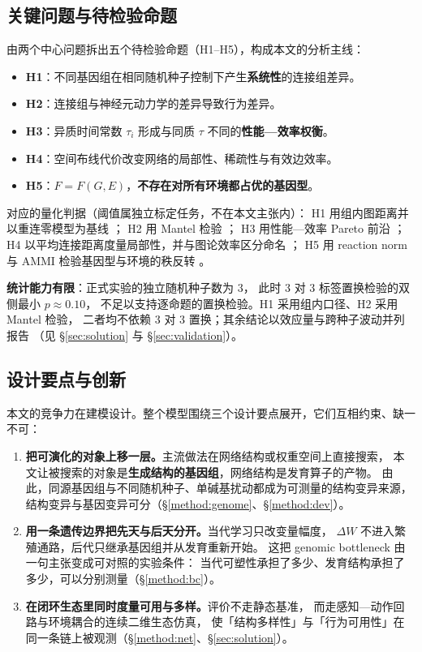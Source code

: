 \subsection{关键问题与待检验命题}\label{sec:rq}

由两个中心问题拆出五个待检验命题（H1--H5），构成本文的分析主线：

\begin{itemize}
  \item \textbf{H1}：不同基因组在相同随机种子控制下产生\textbf{系统性}的连接组差异。
  \item \textbf{H2}：连接组与神经元动力学的差异导致行为差异。
  \item \textbf{H3}：异质时间常数 $\tau_i$ 形成与同质 $\tau$ 不同的\textbf{性能—效率权衡}。
  \item \textbf{H4}：空间布线代价改变网络的局部性、稀疏性与有效边效率。
  \item \textbf{H5}：$F=F(G,E)$，\textbf{不存在对所有环境都占优的基因型}。
\end{itemize}

对应的量化判据（阈值属独立标定任务，不在本文主张内）：
H1 用组内图距离并以重连零模型为基线 \citep{bib20_hartle2020}；
H2 用 Mantel 检验 \citep{bib21_smouse1986}；
H3 用性能—效率 Pareto 前沿 \citep{bib23_deb2002}；
H4 以平均连接距离度量局部性，并与图论效率区分命名 \citep{bib22_latora2001}；
H5 用 reaction norm 与 AMMI 检验基因型与环境的秩反转
\citep{bib24_via1985,bib25_malosetti2013}。

\textbf{统计能力有限}：正式实验的独立随机种子数为 $3$，
此时 $3$ 对 $3$ 标签置换检验的双侧最小 $p\approx0.10$，
不足以支持逐命题的置换检验。H1 采用组内口径、H2 采用 Mantel 检验，
二者均不依赖 $3$ 对 $3$ 置换；其余结论以效应量与跨种子波动并列报告
（见 \S\ref{sec:solution} 与 \S\ref{sec:validation}）。

\subsection{设计要点与创新}\label{sec:innovation}

本文的竞争力在建模设计。整个模型围绕三个设计要点展开，它们互相约束、缺一不可：

\begin{enumerate}
  \item \textbf{把可演化的对象上移一层。}主流做法在网络结构或权重空间上直接搜索，
        本文让被搜索的对象是\textbf{生成结构的基因组}，网络结构是发育算子的产物。
        由此，同源基因组与不同随机种子、单碱基扰动都成为可测量的结构变异来源，
        结构变异与基因变异可分（\S\ref{method:genome}、\S\ref{method:dev}）。
  \item \textbf{用一条遗传边界把先天与后天分开。}当代学习只改变量幅度，
        $\Delta W$ 不进入繁殖通路，后代只继承基因组并从发育重新开始。
        这把 genomic bottleneck 由一句主张变成可对照的实验条件：
        当代可塑性承担了多少、发育结构承担了多少，可以分别测量（\S\ref{method:bc}）。
  \item \textbf{在闭环生态里同时度量可用与多样。}评价不走静态基准，
        而走感知—动作回路与环境耦合的连续二维生态仿真，
        使「结构多样性」与「行为可用性」在同一条链上被观测（\S\ref{method:net}、\S\ref{sec:solution}）。
\end{enumerate}

